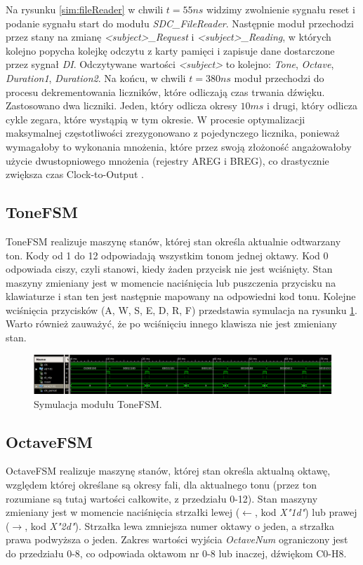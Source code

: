 \documentclass[a4paper,12pt]{article}
\begin{document}
Na rysunku \ref{sim:fileReader} w chwili $t=55ns$ widzimy zwolnienie sygnału reset i podanie sygnału start do modułu \textit{SDC\_FileReader}. Następnie moduł przechodzi przez stany na zmianę \textit{<subject>\_Request} i \textit{<subject>\_Reading}, w których kolejno popycha kolejkę odczytu z karty pamięci i zapisuje dane dostarczone przez sygnał \textit{DI}. Odczytywane wartości \textit{<subject>} to kolejno: \textit{Tone}, \textit{Octave}, \textit{Duration1}, \textit{Duration2}. Na końcu, w chwili $t=380ns$ moduł przechodzi do procesu dekrementowania liczników, które odliczają czas trwania dźwięku. Zastosowano dwa liczniki. Jeden, który odlicza okresy $10ms$ i drugi, który odlicza cykle zegara, które wystąpią w tym okresie. W procesie optymalizacji maksymalnej częstotliwości zrezygonowano z pojedynczego licznika, ponieważ wymagałoby to wykonania mnożenia, które przez swoją złożoność angażowałoby użycie dwustopniowego mnożenia (rejestry AREG i BREG), co drastycznie zwiększa czas Clock-to-Output \cite[s. 43, 138]{web:datasheet}.



\subsection{ToneFSM}
ToneFSM realizuje maszynę stanów, której stan określa aktualnie odtwarzany ton.
Kody od 1 do 12 odpowiadają wszystkim tonom jednej oktawy. Kod 0 odpowiada ciszy, czyli stanowi, kiedy żaden przycisk nie jest wciśnięty. Stan maszyny zmieniany jest w momencie naciśnięcia lub puszczenia przycisku na klawiaturze i stan ten jest następnie mapowany na odpowiedni kod tonu. Kolejne wciśnięcia przycisków (A, W, S, E, D, R, F) przedstawia symulacja na rysunku \ref{sim:tone}. Warto również zauważyć, że po wciśnięciu innego klawisza nie jest zmieniany stan.

\begin{figure}[h]
  \centering
  \includegraphics[decodearray={1 0 1 0 1 0}, width=\linewidth]{images/tone}
  \caption{Symulacja modułu ToneFSM.}
  \label{sim:tone}
\end{figure}

\subsection{OctaveFSM}
OctaveFSM realizuje maszynę stanów, której stan określa aktualną oktawę, względem której określane są okresy fali, dla aktualnego tonu (przez ton rozumiane są tutaj wartości całkowite, z przedziału 0-12). Stan maszyny zmieniany jest w momencie naciśnięcia strzałki lewej ($\leftarrow$, kod \textit{X"1d"}) lub prawej ($\rightarrow$, kod \textit{X"2d"}). Strzałka lewa zmniejsza numer oktawy o jeden, a strzałka prawa podwyższa o jeden. Zakres wartości wyjścia \textit{OctaveNum} ograniczony jest do przedziału 0-8, co odpowiada oktawom nr 0-8 lub inaczej, dźwiękom C0-H8. 
\end{document}
